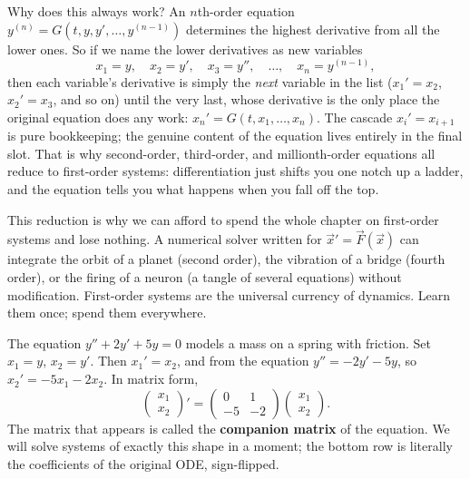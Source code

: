 \begin{whybox}
Why does this always work? An $n$th-order equation
$y^{(n)} = G(t, y, y', \dots, y^{(n-1)})$ determines the highest derivative from
all the lower ones. So if we name the lower derivatives as new variables
\[
  x_1 = y,\quad x_2 = y',\quad x_3 = y'',\quad \dots,\quad x_n = y^{(n-1)},
\]
then each variable's derivative is simply the \emph{next} variable in the
list ($x_1' = x_2$, $x_2' = x_3$, and so on) until the very last, whose
derivative is the only place the original equation does any work:
$x_n' = G(t, x_1, \dots, x_n)$. The cascade $x_i' = x_{i+1}$ is pure
bookkeeping; the genuine content of the equation lives entirely in the final
slot. That is why second-order, third-order, and millionth-order equations all
reduce to first-order systems: differentiation just shifts you one notch up a
ladder, and the equation tells you what happens when you fall off the top.
\end{whybox}

\begin{aestheticbox}
This reduction is why we can afford to spend the whole chapter on first-order
systems and lose nothing. A numerical solver written for $\vec x' = \vec F(\vec
x)$ can integrate the orbit of a planet (second order), the vibration of a
bridge (fourth order), or the firing of a neuron (a tangle of several equations)
without modification. First-order systems are the universal currency of
dynamics. Learn them once; spend them everywhere.
\end{aestheticbox}

\begin{example}
\label{ch39:ex-damped}
The equation $y'' + 2y' + 5y = 0$ models a mass on a spring with friction. Set
$x_1 = y$, $x_2 = y'$. Then $x_1' = x_2$, and from the equation
$y'' = -2y' - 5y$, so $x_2' = -5x_1 - 2x_2$. In matrix form,
\[
  \begin{pmatrix} x_1 \\ x_2 \end{pmatrix}'
  =
  \begin{pmatrix} 0 & 1 \\ -5 & -2 \end{pmatrix}
  \begin{pmatrix} x_1 \\ x_2 \end{pmatrix}.
\]
The matrix that appears is called the \textbf{companion matrix} of the equation.
We will solve systems of exactly this shape in a moment; the bottom row is
literally the coefficients of the original ODE, sign-flipped.
\end{example}

